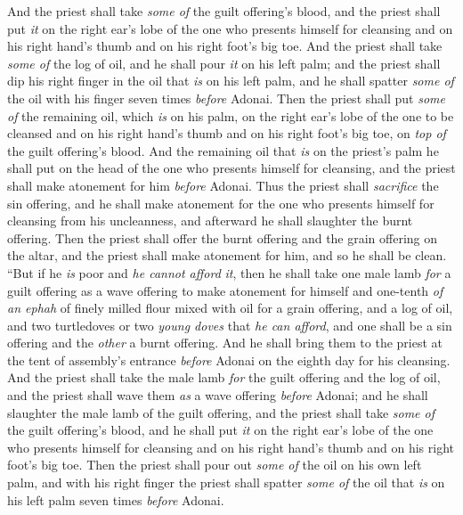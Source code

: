 \begin{biblechapter}
\verse And the priest shall take \textit{some of} the guilt offering’s blood, and the priest shall put \textit{it} on the right ear’s lobe of the one who presents himself for cleansing and on his right hand’s thumb and on his right foot’s big toe.
\verse And the priest shall take \textit{some of} the log of oil, and he shall pour \textit{it} on his left palm;
\verse and the priest shall dip his right finger in the oil that \textit{is} on his left palm, and he shall spatter \textit{some of} the oil with his finger seven times \textit{before} Adonai.
\verse Then the priest shall put \textit{some of} the remaining oil, which \textit{is} on his palm, on the right ear’s lobe of the one to be cleansed and on his right hand’s thumb and on his right foot’s big toe, on \textit{top of} the guilt offering’s blood.
\verse And the remaining oil that \textit{is} on the priest’s palm he shall put on the head of the one who presents himself for cleansing, and the priest shall make atonement for him \textit{before} Adonai.
\verse Thus the priest shall \textit{sacrifice} the sin offering, and he shall make atonement for the one who presents himself for cleansing from his uncleanness, and afterward he shall slaughter the burnt offering.
\verse Then the priest shall offer the burnt offering and the grain offering on the altar, and the priest shall make atonement for him, and so he shall be clean.
\verse “But if he \textit{is} poor and \textit{he cannot afford} \textit{it}, then he shall take one male lamb \textit{for} a guilt offering as a wave offering to make atonement for himself and one-tenth \textit{of an ephah} of finely milled flour mixed with oil for a grain offering, and a log of oil,
\verse and two turtledoves or two \textit{young doves} that \textit{he can afford}, and one shall be a sin offering and the \textit{other} a burnt offering.
\verse And he shall bring them to the priest at the tent of assembly’s entrance \textit{before} Adonai on the eighth day for his cleansing.
\verse And the priest shall take the male lamb \textit{for} the guilt offering and the log of oil, and the priest shall wave them \textit{as} a wave offering \textit{before} Adonai;
\verse and he shall slaughter the male lamb of the guilt offering, and the priest shall take \textit{some of} the guilt offering’s blood, and he shall put \textit{it} on the right ear’s lobe of the one who presents himself for cleansing and on his right hand’s thumb and on his right foot’s big toe.
\verse Then the priest shall pour out \textit{some of} the oil on his own left palm,
\verse and with his right finger the priest shall spatter \textit{some of} the oil that \textit{is} on his left palm seven times \textit{before} Adonai.

\end{biblechapter}
